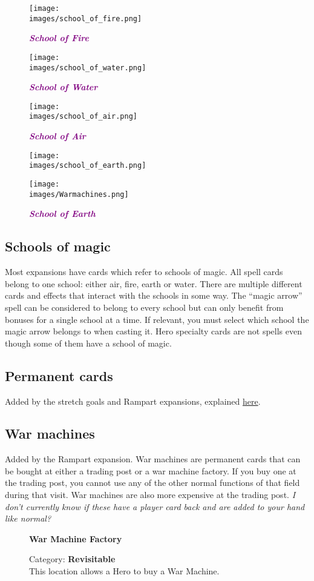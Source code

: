 \begin{wrapfigure}{R}{0.5\textwidth}
  \begin{center}
      \centering
      \texttt{[image: \\images/school\_of\_fire.png]}
      \caption{{\textit{\textbf{\textcolor{purple}{School of Fire}}}}}
    \endminipage
      \centering
      \texttt{[image: \\images/school\_of\_water.png]}
      \caption{{\textit{\textbf{\textcolor{purple}{School of Water}}}}}
    \endminipage
    \hfill\allowbreak%
    \bigbreak
      \centering
      \texttt{[image: \\images/school\_of\_air.png]}
      \caption{{\textit{\textbf{\textcolor{purple}{School of Air}}}}}
    \endminipage
      \centering
      \texttt{[image: \\images/school\_of\_earth.png]}
      \caption{{\textit{\textbf{\textcolor{purple}{School of Earth}}}}}
    \endminipage
    \hfill\allowbreak%
    \bigbreak
    \texttt{[image: \\images/Warmachines.png]}
  \end{center}
\end{wrapfigure}
\subsection*{Schools of magic}
Most expansions have cards which refer to schools of magic.
All spell cards belong to one school: either air, fire, earth or water.
There are multiple different cards and effects that interact with the schools in some way.
The “magic arrow” spell can be considered to belong to every school but can only benefit from bonuses for a single school at a time.
If relevant, you must select which school the magic arrow belongs to when casting it.
Hero specialty cards are not spells even though some of them have a school of magic.
\subsection*{Permanent cards}
Added by the stretch goals and Rampart expansions, explained \hyperlink{Playerdecks}{here}.
\subsection*{War machines}
Added by the Rampart expansion.
War machines are permanent cards that can be bought at either a trading post or a war machine factory.
If you buy one at the trading post, you cannot use any of the other normal functions of that field during that visit.
War machines are also more expensive at the trading post.
\textit{I don't currently know if these have a player card back and are added to your hand like normal?}\par
\begin{wrapfigure}{r}{0.4\textwidth}
  \textbf{War Machine Factory}\\
  \caption{Category: \textbf{Revisitable}\\This location allows a Hero to buy a War Machine.}
\end{wrapfigure}


